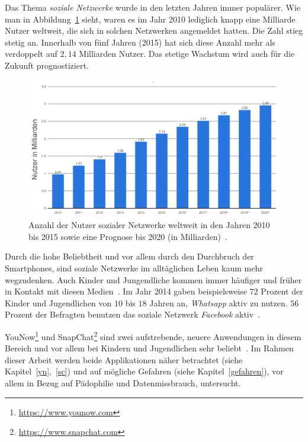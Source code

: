 Das Thema \emph{soziale Netzwerke} wurde in den letzten Jahren immer
popul\"arer. Wie man in Abbildung~\ref{fig:overall} sieht, waren es im Jahr
2010 lediglich knapp eine Milliarde Nutzer weltweit, die sich in solchen
Netzwerken angemeldet hatten. Die Zahl stieg stetig an. Innerhalb von f\"unf
Jahren (2015) hat sich diese Anzahl mehr als verdoppelt auf $2,14$ Milliarden
Nutzer. Das stetige Wachstum wird auch f\"ur die Zukunft prognostiziert.
\begin{figure}[ht]
	\centering
	\includegraphics[scale=0.6]{resources/einf_02.png}
	\caption{Anzahl der Nutzer sozialer Netzwerke weltweit in den Jahren 2010
	bis 2015 sowie eine Prognose bis 2020 (in Milliarden)~\cite{statista-allg}.}
	\label{fig:overall}
\end{figure}

Durch die hohe Beliebtheit und vor allem durch den Durchbruch der Smartphones,
sind soziale Netzwerke im allt\"aglichen Leben kaum mehr wegzudenken. Auch
Kinder und Jungendliche kommen immer h\"aufiger und fr\"uher in Kontakt
mit diesen Medien~\cite{statista-jugendliche}. Im Jahr 2014 gaben
beispielsweise $72$ Prozent der Kinder und Jugendlichen von $10$ bis $18$
Jahren an, \emph{Whatsapp} aktiv zu nutzen. $56$ Prozent der Befragten benutzen
das soziale Netzwerk \emph{Facebook} aktiv~\cite{statista-jugendliche}.


YouNow\footnote{\url{https://www.younow.com}} und
SnapChat\footnote{\url{https://www.snapchat.com}} sind zwei aufstrebende,
neuere Anwendungen in diesem Bereich und vor allem bei Kindern und Jugendlichen
sehr beliebt~\cite{statista-snap,vaterlaus2016snapchat}. Im Rahmen dieser
Arbeit werden beide Applikationen n\"aher betrachtet (siehe
Kapitel~\ref{yn},~\ref{sc}) und auf m\"ogliche Gefahren (siehe
Kapitel~\ref{gefahren}), vor allem in Bezug auf P\"adophilie und
Datenmissbrauch, untersucht.

